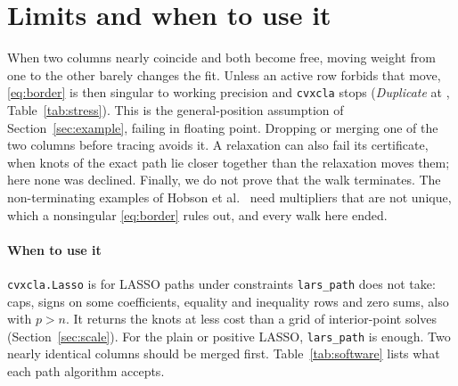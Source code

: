 \documentclass[11pt]{article}
\theoremstyle{remark}
\begin{document}
\section{Limits and when to use it}
\label{sec:limits}

When two columns nearly coincide and both become
free, moving weight from one to the other barely changes the fit. Unless an active row
forbids that move, \eqref{eq:border} is then singular to working precision and
\texttt{cvxcla} stops (\emph{Duplicate} at \stEpsLo{}, Table~\ref{tab:stress}). This is
the general-position assumption of Section~\ref{sec:example}, failing in floating point.
Dropping or merging one of the two columns before tracing avoids it. A relaxation can
also fail its certificate, when knots of the exact path lie closer together than the
relaxation moves them; here none was declined. Finally, we do not prove that the walk
terminates. The non-terminating examples of Hobson et al.\ \cite{hobson2026} need
multipliers that are not unique, which a nonsingular \eqref{eq:border} rules out, and
every walk here ended.

\paragraph{When to use it} \texttt{cvxcla.Lasso} is for LASSO paths under constraints
\texttt{lars\_path} does not take: caps, signs on some coefficients, equality and
inequality rows and zero sums, also with $p>n$. It returns the knots at less cost than
a grid of interior-point solves (Section~\ref{sec:scale}). For the plain or positive
LASSO, \texttt{lars\_path} is enough. Two nearly identical columns should be merged
first. Table~\ref{tab:software} lists what each path algorithm accepts.
\end{document}
